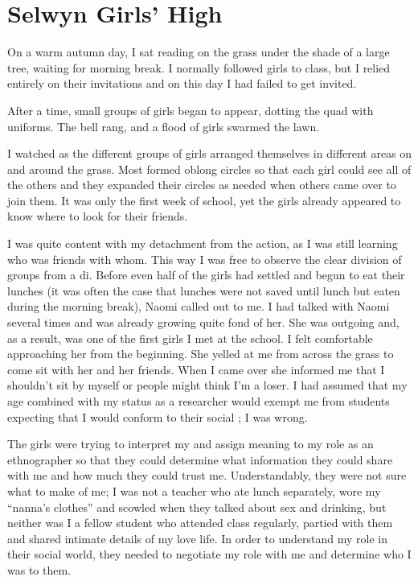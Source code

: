 
\section{Selwyn Girls' High}
On a warm autumn day, I sat reading on the grass under the shade of a large tree, waiting for morning break. I normally followed girls to class, but I relied entirely on their invitations and on this day I had failed to get invited. 


After a time, small groups of girls began to appear, dotting the quad with uniforms. The bell rang, and a flood of girls swarmed the lawn. 

I watched as the different groups of girls arranged themselves in different areas on and around the grass. Most formed oblong circles so that each girl could see all of the others and they expanded their circles as needed when others came over to join them. It was only the first week of school, yet the girls already appeared to know where to look for their friends. 

I was quite content with my detachment from the action, as I was still learning who was friends with whom. This way I was free to observe the clear division of groups from a di. Before even half of the girls had settled and begun to eat their lunches (it was often the case that lunches were not saved until lunch but eaten during the morning break), Naomi called out to me. I had talked with Naomi several times and was already growing quite fond of her. She was outgoing and, as a result, was one of the first girls I met at the school. I felt comfortable approaching her from the beginning. She yelled at me from across the grass to come sit with her and her friends. When I came over she informed me that I shouldn't sit by myself or people might think I'm a loser. I had assumed that my age combined with my status as a researcher would exempt me from students expecting that I would conform to their social ; I was wrong.

The girls were trying to interpret my  and assign meaning to my role as an ethnographer so that they could determine what information they could share with me and how much they could trust me. Understandably, they were not sure what to make of me; I was not a teacher who ate lunch separately, wore my ``nanna's clothes'' and scowled when they talked about sex and drinking, but neither was I a fellow student who attended class regularly, partied with them and shared intimate details of my love life. In order to understand my role in their social world, they needed to negotiate my role with me and determine who I was to them.

